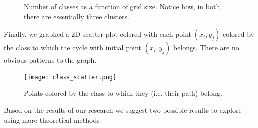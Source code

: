 \documentclass{article}
\begin{document}
\begin{figure}[h!]

\caption{Number of classes as a function of grid size. Notice how, in both, there are essentially three clusters.}
\end{figure}

Finally, we graphed a 2D scatter plot colored with each point $(x_i, y_j)$ colored by the class to which the cycle with initial point $(x_i, y_j)$ belongs. There are no obvious patterns to the graph.

\begin{figure}[h!]
\centering
\texttt{[image: class\_scatter.png]}
\caption{Points colored by the class to which they (i.e. their path) belong.}
\end{figure}

Based on the results of our research we suggest two possible results to explore using more theoretical methods
\end{document}
